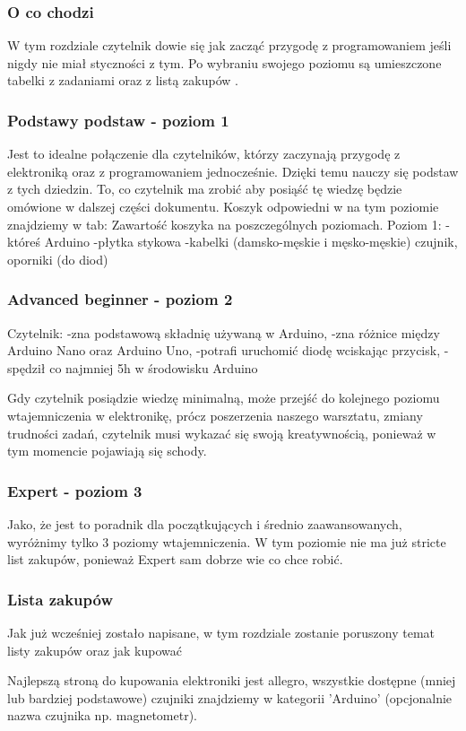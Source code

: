 \subsubsection{ O co chodzi}
W tym rozdziale czytelnik dowie się jak zacząć przygodę z programowaniem jeśli nigdy nie miał styczności z tym. Po wybraniu swojego poziomu są umieszczone tabelki z zadaniami oraz z listą zakupów .
\subsubsection{Podstawy podstaw - poziom 1}
Jest to idealne połączenie dla czytelników, którzy zaczynają przygodę z elektroniką oraz z programowaniem jednocześnie. Dzięki temu nauczy się podstaw z tych dziedzin. 
To, co czytelnik ma zrobić aby posiąść tę wiedzę będzie omówione w dalszej części dokumentu. Koszyk odpowiedni w na tym poziomie znajdziemy w tab: Zawartość koszyka na poszczególnych poziomach.
Poziom 1:
-któreś Arduino
-płytka stykowa
-kabelki (damsko-męskie i męsko-męskie)
czujnik, oporniki (do diod)
\subsubsection{Advanced beginner - poziom 2}
Czytelnik:
-zna podstawową składnię używaną w Arduino,
-zna różnice między Arduino Nano oraz Arduino Uno,
-potrafi uruchomić diodę wciskając przycisk,
-spędził co najmniej 5h w środowisku Arduino

Gdy czytelnik posiądzie wiedzę minimalną, może przejść do kolejnego poziomu wtajemniczenia w elektronikę, prócz poszerzenia naszego warsztatu, zmiany trudności zadań, czytelnik musi wykazać się swoją kreatywnością, ponieważ w tym momencie pojawiają się schody.

\subsubsection{Expert - poziom 3}
Jako, że jest to poradnik dla początkujących i średnio zaawansowanych, wyróżnimy tylko 3 poziomy wtajemniczenia. W tym poziomie nie ma już stricte list zakupów, ponieważ Expert sam dobrze wie co chce robić. 
\subsubsection{Lista zakupów}
Jak już wcześniej zostało napisane, w tym rozdziale zostanie poruszony temat listy zakupów oraz jak kupować

 Najlepszą stroną do kupowania elektroniki jest allegro, wszystkie dostępne (mniej lub bardziej podstawowe) czujniki znajdziemy w kategorii 'Arduino' (opcjonalnie nazwa czujnika np. magnetometr).

